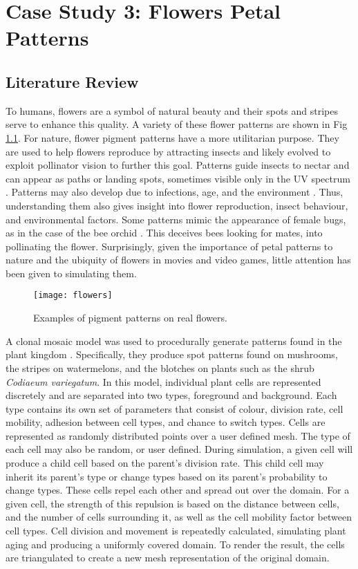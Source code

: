 \chapter{Case Study 3: Flowers Petal Patterns}

\section{Literature Review}
To humans, flowers are a symbol of natural beauty and their spots and stripes serve to enhance this quality. A variety of these flower patterns are shown in Fig \ref{fig:realFlowers}. For nature, flower pigment patterns have a more  utilitarian purpose. They are used to help flowers reproduce by attracting insects and likely evolved to exploit pollinator vision to further this goal. Patterns guide insects to nectar and can appear as paths or landing spots, sometimes visible only in the UV spectrum \citep{Davies2012}. Patterns may also develop due to infections, age, and the environment \citep{Davies2012} \citep{ROBINSON2015}. Thus, understanding them also gives insight into flower reproduction, insect behaviour, and environmental factors. Some patterns mimic the appearance of female bugs, as in the case of the bee orchid \citep{Vereecken7484}. This deceives bees looking for mates, into pollinating the flower. Surprisingly, given the importance of petal patterns to nature and the ubiquity of flowers in movies and video games, little attention has been given to simulating them. 

\begin{figure}[!ht]
	\centering
	\texttt{[image: flowers]}
	\caption{Examples of pigment patterns on real flowers.}
	\label{fig:realFlowers}
\end{figure}
A clonal mosaic model was used to procedurally generate patterns found in the plant kingdom \citep{binsfeld2011}. Specifically, they produce spot patterns found on mushrooms, the stripes on watermelons, and the blotches on plants such as the shrub \textit{Codiaeum variegatum}. In this model, individual plant cells are represented discretely and are separated into two types, foreground and background. Each type contains its own set of parameters that consist of colour, division rate, cell mobility, adhesion between cell types, and chance to switch types. Cells are represented as randomly distributed points over a user defined mesh. The type of each cell may also be random, or user defined. During simulation, a given cell will produce a child cell based on the parent's division rate. This child cell may inherit its parent's type or change types based on its parent's probability to change types. These cells repel each other and spread out over the domain. For a given cell, the strength of this repulsion is based on the distance between cells, and the number of cells surrounding it, as well as the cell mobility factor between cell types. Cell division and movement is repeatedly calculated, simulating plant aging and producing a uniformly covered domain. To render the result, the cells are triangulated to create a new mesh representation of the original domain. 

